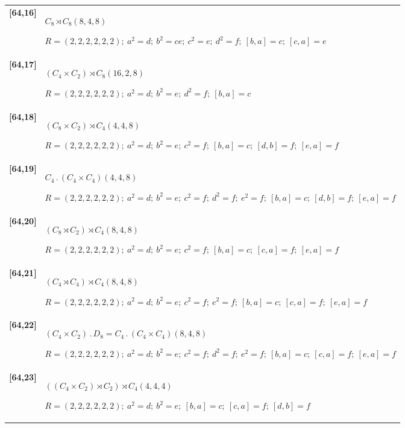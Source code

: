 \documentclass[UTF8,fontset=fandol,11pt,a4paper]{ctexart}
\begin{document}
\begin{longtable}{@{}p{17mm}>{\raggedright\arraybackslash}p{141mm}@{}}
\textbf{[64,16]} & $C_{8}\rtimes C_{8}$\quad $(8,4,8)$\par\(R=(2,2,2,2,2,2);\allowbreak\ a^{2}=d;\allowbreak\ b^{2}=ce;\allowbreak\ c^{2}=e;\allowbreak\ d^{2}=f;\allowbreak\ [b,a]=c;\allowbreak\ [c,a]=e\)\\[3pt]

\textbf{[64,17]} & $(C_{4}\times C_{2})\rtimes C_{8}$\quad $(16,2,8)$\par\(R=(2,2,2,2,2,2);\allowbreak\ a^{2}=d;\allowbreak\ b^{2}=e;\allowbreak\ d^{2}=f;\allowbreak\ [b,a]=c\)\\[3pt]

\textbf{[64,18]} & $(C_{8}\times C_{2})\rtimes C_{4}$\quad $(4,4,8)$\par\(R=(2,2,2,2,2,2);\allowbreak\ a^{2}=d;\allowbreak\ b^{2}=e;\allowbreak\ c^{2}=f;\allowbreak\ [b,a]=c;\allowbreak\ [d,b]=f;\allowbreak\ [e,a]=f\)\\[3pt]

\textbf{[64,19]} & $C_{4}\mathbin{.} (C_{4}\times C_{4})$\quad $(4,4,8)$\par\(R=(2,2,2,2,2,2);\allowbreak\ a^{2}=d;\allowbreak\ b^{2}=e;\allowbreak\ c^{2}=f;\allowbreak\ d^{2}=f;\allowbreak\ e^{2}=f;\allowbreak\ [b,a]=c;\allowbreak\ [d,b]=f;\allowbreak\ [e,a]=f\)\\[3pt]

\textbf{[64,20]} & $(C_{8}\rtimes C_{2})\rtimes C_{4}$\quad $(8,4,8)$\par\(R=(2,2,2,2,2,2);\allowbreak\ a^{2}=d;\allowbreak\ b^{2}=e;\allowbreak\ c^{2}=f;\allowbreak\ [b,a]=c;\allowbreak\ [c,a]=f;\allowbreak\ [e,a]=f\)\\[3pt]

\textbf{[64,21]} & $(C_{4}\rtimes C_{4})\rtimes C_{4}$\quad $(8,4,8)$\par\(R=(2,2,2,2,2,2);\allowbreak\ a^{2}=d;\allowbreak\ b^{2}=e;\allowbreak\ c^{2}=f;\allowbreak\ e^{2}=f;\allowbreak\ [b,a]=c;\allowbreak\ [c,a]=f;\allowbreak\ [e,a]=f\)\\[3pt]

\textbf{[64,22]} & $(C_{4}\times C_{2})\mathbin{.} D_{8} = C_{4}\mathbin{.} (C_{4}\times C_{4})$\quad $(8,4,8)$\par\(R=(2,2,2,2,2,2);\allowbreak\ a^{2}=d;\allowbreak\ b^{2}=e;\allowbreak\ c^{2}=f;\allowbreak\ d^{2}=f;\allowbreak\ e^{2}=f;\allowbreak\ [b,a]=c;\allowbreak\ [c,a]=f;\allowbreak\ [e,a]=f\)\\[3pt]

\textbf{[64,23]} & $((C_{4}\times C_{2})\rtimes C_{2})\rtimes C_{4}$\quad $(4,4,4)$\par\(R=(2,2,2,2,2,2);\allowbreak\ a^{2}=d;\allowbreak\ b^{2}=e;\allowbreak\ [b,a]=c;\allowbreak\ [c,a]=f;\allowbreak\ [d,b]=f\)\\[3pt]


\end{longtable}
\end{document}
